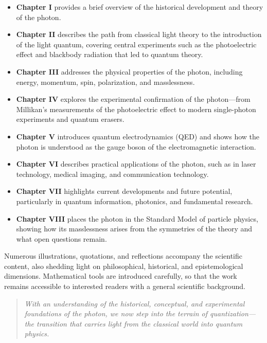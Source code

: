 \begin{itemize}
	\item \textbf{Chapter I} provides a brief overview of the historical development and theory of the photon.
	\item \textbf{Chapter II} describes the path from classical light theory to the introduction of the light quantum, covering central experiments such as the photoelectric effect and blackbody radiation that led to quantum theory.
	
	\item \textbf{Chapter III} addresses the physical properties of the photon, including energy, momentum, spin, polarization, and masslessness.
	
	\item \textbf{Chapter IV} explores the experimental confirmation of the photon—from Millikan’s measurements of the photoelectric effect to modern single-photon experiments and quantum erasers.
	
	\item \textbf{Chapter V} introduces quantum electrodynamics (QED) and shows how the photon is understood as the gauge boson of the electromagnetic interaction.
	
	\item \textbf{Chapter VI} describes practical applications of the photon, such as in laser technology, medical imaging, and communication technology.
	
	\item \textbf{Chapter VII} highlights current developments and future potential, particularly in quantum information, photonics, and fundamental research.
	
	\item \textbf{Chapter VIII} places the photon in the Standard Model of particle physics, showing how its masslessness arises from the symmetries of the theory and what open questions remain.
\end{itemize}
Numerous illustrations, quotations, and reflections accompany the scientific content, also shedding light on philosophical, historical, and epistemological dimensions. Mathematical tools are introduced carefully, so that the work remains accessible to interested readers with a general scientific background.

\begin{quote}
	\textit{With an understanding of the historical, conceptual, and experimental foundations of the photon, we now step into the terrain of quantization—the transition that carries light from the classical world into quantum physics.}
\end{quote}

